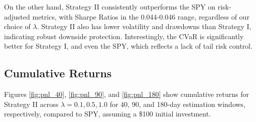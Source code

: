 \documentclass[12pt]{article}
\begin{document}
On the other hand, Strategy II consistently outperforms the SPY on risk-adjusted metrics, with Sharpe Ratios in the 0.044-0.046 range, regardless of our choice of $\lambda$. Strategy II also has lower volatility and drawdowns than Strategy I, indicating robust downside protection. Interestingly, the CVaR is significantly better for Strategy I, and even the SPY, which reflects a lack of tail risk control.

\subsection{Cumulative Returns}
Figures \ref{fig:pnl_40}, \ref{fig:pnl_90}, and \ref{fig:pnl_180} show cumulative returns for Strategy II across $\lambda = 0.1, 0.5, 1.0$ for 40, 90, and 180-day estimation windows, respectively, compared to SPY, assuming a \$100 initial investment.
\end{document}
